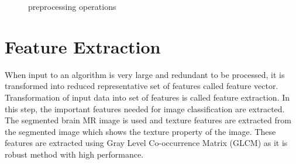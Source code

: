 \documentclass[10pt]{report}
\begin{document}
	\begin{figure}[ht]
		\centering
		\hspace{0.5cm}
		\hspace{0.5cm}
		\hspace{0.5cm}
		\caption{preprocessing operations}
		\label{Preprocessing Operations}
	\end{figure}

	\section{Feature Extraction}%

	When input to an algorithm is very large and
	redundant to be processed, it is transformed into reduced representative set
	of features called feature vector. Transformation of input data into set of
	features is called feature extraction. In this step, the important features
	needed for image classification are extracted. The segmented brain MR image
	is used and texture features are extracted from the segmented image which
	shows the texture property of the image. These features are extracted using
	Gray Level Co-occurrence Matrix (GLCM) as it is robust method with high
	performance.
\end{document}
